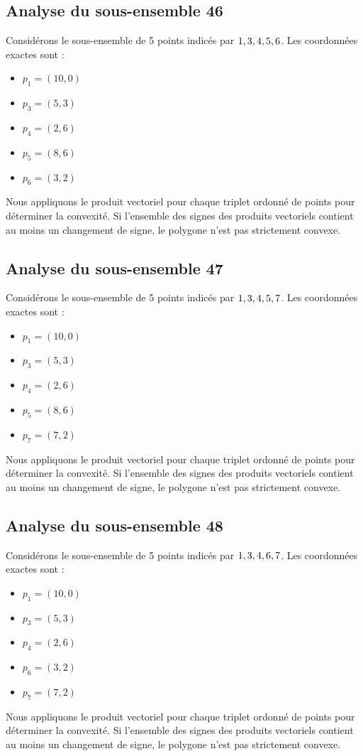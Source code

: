 \documentclass[11pt]{article}
\begin{document}
\subsection{Analyse du sous-ensemble 46}
Considérons le sous-ensemble de 5 points indicés par $\\{ 1, 3, 4, 5, 6 \\}$.
Les coordonnées exactes sont :
\begin{itemize}
\item $p_1 = (10, 0)$
\item $p_3 = (5, 3)$
\item $p_4 = (2, 6)$
\item $p_5 = (8, 6)$
\item $p_6 = (3, 2)$
\end{itemize}
Nous appliquons le produit vectoriel pour chaque triplet ordonné de points pour déterminer la convexité. Si l'ensemble des signes des produits vectoriels contient au moins un changement de signe, le polygone n'est pas strictement convexe.
\newpage

\subsection{Analyse du sous-ensemble 47}
Considérons le sous-ensemble de 5 points indicés par $\\{ 1, 3, 4, 5, 7 \\}$.
Les coordonnées exactes sont :
\begin{itemize}
\item $p_1 = (10, 0)$
\item $p_3 = (5, 3)$
\item $p_4 = (2, 6)$
\item $p_5 = (8, 6)$
\item $p_7 = (7, 2)$
\end{itemize}
Nous appliquons le produit vectoriel pour chaque triplet ordonné de points pour déterminer la convexité. Si l'ensemble des signes des produits vectoriels contient au moins un changement de signe, le polygone n'est pas strictement convexe.
\newpage

\subsection{Analyse du sous-ensemble 48}
Considérons le sous-ensemble de 5 points indicés par $\\{ 1, 3, 4, 6, 7 \\}$.
Les coordonnées exactes sont :
\begin{itemize}
\item $p_1 = (10, 0)$
\item $p_3 = (5, 3)$
\item $p_4 = (2, 6)$
\item $p_6 = (3, 2)$
\item $p_7 = (7, 2)$
\end{itemize}
Nous appliquons le produit vectoriel pour chaque triplet ordonné de points pour déterminer la convexité. Si l'ensemble des signes des produits vectoriels contient au moins un changement de signe, le polygone n'est pas strictement convexe.
\newpage
\end{document}

